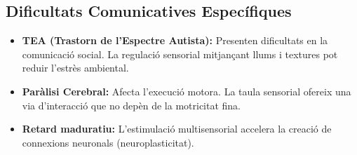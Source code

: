 \subsection{Dificultats Comunicatives Específiques}
\begin{itemize}
    \item \textbf{TEA (Trastorn de l'Espectre Autista):} Presenten dificultats en la comunicació social. La regulació sensorial mitjançant llums i textures pot reduir l'estrès ambiental.
    \item \textbf{Paràlisi Cerebral:} Afecta l'execució motora. La taula sensorial ofereix una via d'interacció que no depèn de la motricitat fina.
    \item \textbf{Retard maduratiu:} L'estimulació multisensorial accelera la creació de connexions neuronals (neuroplasticitat).
\end{itemize}
